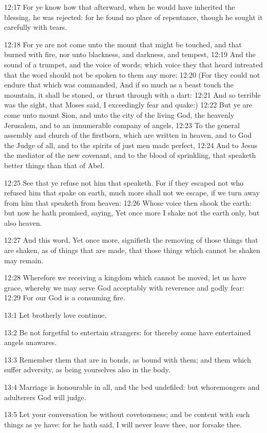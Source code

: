12:17 For ye know how that afterward, when he would have inherited the
blessing, he was rejected: for he found no place of repentance, though
he sought it carefully with tears.

12:18 For ye are not come unto the mount that might be touched, and
that burned with fire, nor unto blackness, and darkness, and tempest,
12:19 And the sound of a trumpet, and the voice of words; which voice
they that heard intreated that the word should not be spoken to them
any more: 12:20 (For they could not endure that which was commanded,
And if so much as a beast touch the mountain, it shall be stoned, or
thrust through with a dart: 12:21 And so terrible was the sight, that
Moses said, I exceedingly fear and quake:) 12:22 But ye are come unto
mount Sion, and unto the city of the living God, the heavenly
Jerusalem, and to an innumerable company of angels, 12:23 To the
general assembly and church of the firstborn, which are written in
heaven, and to God the Judge of all, and to the spirits of just men
made perfect, 12:24 And to Jesus the mediator of the new covenant, and
to the blood of sprinkling, that speaketh better things than that of
Abel.

12:25 See that ye refuse not him that speaketh. For if they escaped
not who refused him that spake on earth, much more shall not we
escape, if we turn away from him that speaketh from heaven: 12:26
Whose voice then shook the earth: but now he hath promised, saying,
Yet once more I shake not the earth only, but also heaven.

12:27 And this word, Yet once more, signifieth the removing of those
things that are shaken, as of things that are made, that those things
which cannot be shaken may remain.

12:28 Wherefore we receiving a kingdom which cannot be moved, let us
have grace, whereby we may serve God acceptably with reverence and
godly fear: 12:29 For our God is a consuming fire.

13:1 Let brotherly love continue.

13:2 Be not forgetful to entertain strangers: for thereby some have
entertained angels unawares.

13:3 Remember them that are in bonds, as bound with them; and them
which suffer adversity, as being yourselves also in the body.

13:4 Marriage is honourable in all, and the bed undefiled: but
whoremongers and adulterers God will judge.

13:5 Let your conversation be without covetousness; and be content
with such things as ye have: for he hath said, I will never leave
thee, nor forsake thee.

